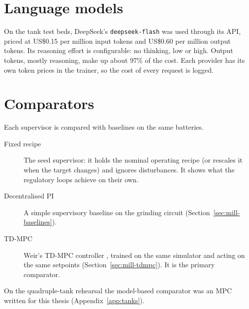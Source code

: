 \section{Language models}
\label{sec:models}
On the tank test beds, DeepSeek's \texttt{deepseek-flash} was used through its
API, priced at US\$0.15 per million input tokens and US\$0.60 per million
output tokens. Its reasoning effort is configurable:
no thinking, low or high. Output tokens, mostly reasoning, make up about 97\%
of the cost. Each provider has its own
token prices in the trainer, so the cost of every request is logged.

\section{Comparators}
\label{sec:comparators}
Each supervisor is compared with baselines on the same batteries.
\begin{description}
\item[Fixed recipe] The seed supervisor: it holds the nominal operating
  recipe (or rescales it when the target changes) and ignores disturbances.
  It shows what the regulatory loops achieve on their own.
\item[Decentralised PI] A simple supervisory baseline on the grinding
  circuit (Section~\ref{sec:mill-baselines}).
\item[TD-MPC] Weir's TD-MPC controller
  \cite{hansen2022tdmpc}, trained on the same simulator and acting on the
  same setpoints (Section~\ref{sec:mill-tdmpc}). It is the primary comparator.
\end{description}
On the quadruple-tank rehearsal the model-based comparator was an MPC written
for this thesis (Appendix~\ref{app:tanks}).

